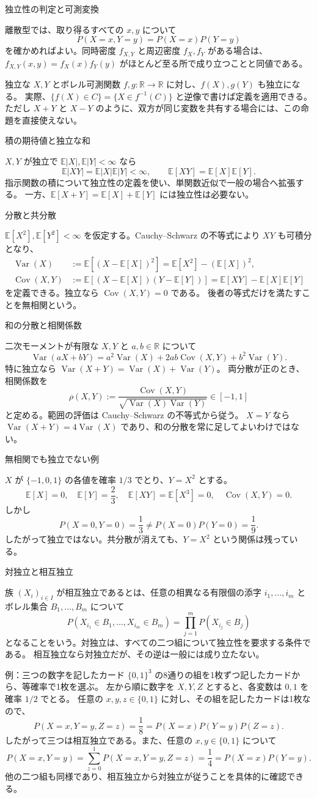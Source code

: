 \documentclass[a4paper,10pt,pdflatex,ja=standard,jafont=ipaex-type1,
  magstyle=real,scale=1]{bxjsarticle}
\newcommand{\topic}[1]{\par\vspace{5pt}
  {\large\sffamily\mdseries\color{accent}#1}\par\vspace{2pt}}
\newcommand{\examplelabel}[1]{{\sffamily\mdseries\color{ink}#1}}
\newcommand{\R}{\mathbb R}
\newcommand{\E}{\mathbb E}
\newcommand{\Var}{\operatorname{Var}}
\newcommand{\Cov}{\operatorname{Cov}}
\begin{document}
\topic{独立性の判定と可測変換}
離散型では、取り得るすべての $x,y$ について
$$P(X=x,Y=y)=P(X=x)P(Y=y)$$
を確かめればよい。同時密度 $f_{X,Y}$ と周辺密度 $f_X,f_Y$ がある場合は、
$f_{X,Y}(x,y)=f_X(x)f_Y(y)$ がほとんど至る所で成り立つことと同値である。

独立な $X,Y$ とボレル可測関数 $f,g:\R\to\R$ に対し、$f(X),g(Y)$ も独立になる。
実際、$\{f(X)\in C\}=\{X\in f^{-1}(C)\}$ と逆像で書けば定義を適用できる。
ただし $X+Y$ と $X-Y$ のように、双方が同じ変数を共有する場合には、この命題を直接使えない。

\topic{積の期待値と独立な和}
$X,Y$ が独立で $\E|X|,\E|Y|<\infty$ なら
$$\E|XY|=\E|X|\E|Y|<\infty,\qquad \E[XY]=\E[X]\E[Y].$$
指示関数の積について独立性の定義を使い、単関数近似で一般の場合へ拡張する。
一方、$\E[X+Y]=\E[X]+\E[Y]$ には独立性は必要ない。

\topic{分散と共分散}
$\E[X^2],\E[Y^2]<\infty$ を仮定する。Cauchy--Schwarz の不等式により
$XY$ も可積分となり、
$$
 \begin{aligned}
 \Var(X)&:=\E[(X-\E[X])^2]=\E[X^2]-(\E[X])^2,\\
 \Cov(X,Y)&:=\E[(X-\E[X])(Y-\E[Y])]=\E[XY]-\E[X]\E[Y]
 \end{aligned}
$$
を定義できる。独立なら $\Cov(X,Y)=0$ である。
後者の等式だけを満たすことを無相関という。

\newpage
\topic{和の分散と相関係数}
二次モーメントが有限な $X,Y$ と $a,b\in\R$ について
$$\Var(aX+bY)=a^2\Var(X)+2ab\Cov(X,Y)+b^2\Var(Y).$$
特に独立なら $\Var(X+Y)=\Var(X)+\Var(Y)$。
両分散が正のとき、相関係数を
$$\rho(X,Y):=\frac{\Cov(X,Y)}{\sqrt{\Var(X)\Var(Y)}}\in[-1,1]$$
と定める。範囲の評価は Cauchy--Schwarz の不等式から従う。
$X=Y$ なら $\Var(X+Y)=4\Var(X)$ であり、和の分散を常に足してよいわけではない。

\topic{無相関でも独立でない例}
$X$ が $\{-1,0,1\}$ の各値を確率 $1/3$ でとり、$Y=X^2$ とする。
$$\E[X]=0,\quad\E[Y]=\frac23,\quad
  \E[XY]=\E[X^3]=0,\quad\Cov(X,Y)=0.$$
しかし
$$P(X=0,Y=0)=\frac13\ne P(X=0)P(Y=0)=\frac19.$$
したがって独立ではない。共分散が消えても、$Y=X^2$ という関係は残っている。

\topic{対独立と相互独立}
族 $(X_i)_{i\in I}$ が相互独立であるとは、任意の相異なる有限個の添字
$i_1,\ldots,i_m$ とボレル集合 $B_1,\ldots,B_m$ について
$$P(X_{i_1}\in B_1,\ldots,X_{i_m}\in B_m)
  =\prod_{j=1}^mP(X_{i_j}\in B_j)$$
となることをいう。対独立は、すべての二つ組について独立性を要求する条件である。
相互独立なら対独立だが、その逆は一般には成り立たない。

\examplelabel{例：三つの数字を記したカード}
$\{0,1\}^3$ の8通りの組を1枚ずつ記したカードから、等確率で1枚を選ぶ。
左から順に数字を $X,Y,Z$ とすると、各変数は $0,1$ を確率 $1/2$ でとる。
任意の $x,y,z\in\{0,1\}$ に対し、その組を記したカードは1枚なので、
$$
  P(X=x,Y=y,Z=z)=\frac18=P(X=x)P(Y=y)P(Z=z).
$$
したがって三つは相互独立である。また、任意の $x,y\in\{0,1\}$ について
$$
  P(X=x,Y=y)=\sum_{z=0}^1P(X=x,Y=y,Z=z)=\frac14=P(X=x)P(Y=y).
$$
他の二つ組も同様であり、相互独立から対独立が従うことを具体的に確認できる。
\end{document}
